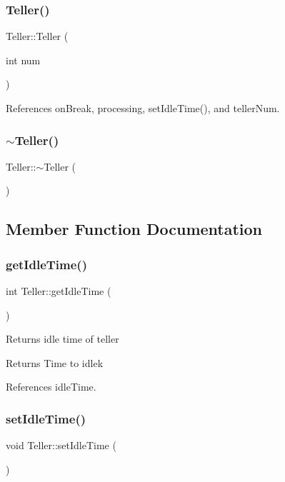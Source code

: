 \subsubsection{Teller()}
{\footnotesize\ttfamily Teller\+::\+Teller (\begin{DoxyParamCaption}\item[{int}]{num }\end{DoxyParamCaption})}



References on\+Break, processing, set\+Idle\+Time(), and teller\+Num.

\mbox{\label{classTeller_af61263c98d7ff236ca84ec551919d7e7}} 
\subsubsection{$\sim$\+Teller()}
{\footnotesize\ttfamily Teller\+::$\sim$\+Teller (\begin{DoxyParamCaption}{ }\end{DoxyParamCaption})\hspace{0.3cm}{\ttfamily [virtual]}}



\subsection{Member Function Documentation}
\mbox{\label{classTeller_a4882535d0d135ba1ae02d83dce94b154}} 
\subsubsection{get\+Idle\+Time()}
{\footnotesize\ttfamily int Teller\+::get\+Idle\+Time (\begin{DoxyParamCaption}{ }\end{DoxyParamCaption})}

Returns idle time of teller \begin{DoxyReturn}{Returns}
Time to idlek 
\end{DoxyReturn}


References idle\+Time.

\mbox{\label{classTeller_a680268b558b302851143234261b33ac7}} 
\subsubsection{set\+Idle\+Time()}
{\footnotesize\ttfamily void Teller\+::set\+Idle\+Time (\begin{DoxyParamCaption}{ }\end{DoxyParamCaption})\hspace{0.3cm}{\ttfamily [private]}}

